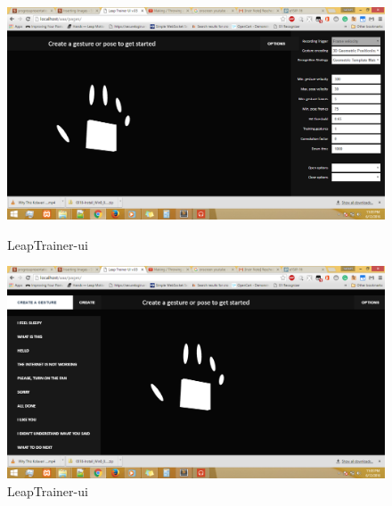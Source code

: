 \documentclass[11pt,a4paper]{article}
\begin{document}
\begin{figure}
  \includegraphics[width=\linewidth]{13.png}
  \caption{LeapTrainer-ui}
  \includegraphics[width=\linewidth]{14.png}
  \caption{LeapTrainer-ui}
\end{figure}
\end{document}
